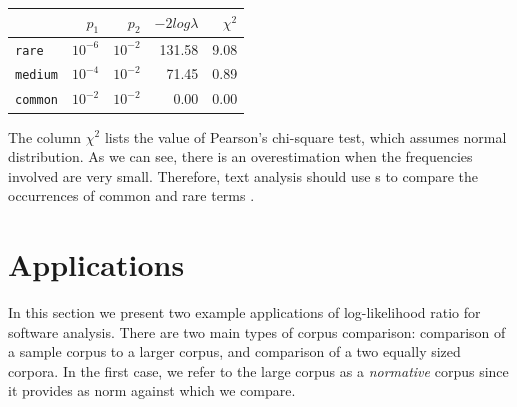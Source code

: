\begin{center}
\begin{tabular}{l | rrrr}
~ & $p_1$ & $p_2$ & $-2log\lambda$ & $\chi^2$ \\ 
\hline
\verb$rare$ & $10^{-6}$ & $10^{-2}$  & 131.58 & 9.08 \\
\verb$medium$ & $10^{-4}$ & $10^{-2}$  & 71.45 & 0.89 \\
\verb$common$ & $10^{-2}$ & $10^{-2}$  & 0.00 & 0.00 \\
\end{tabular}
\end{center}

The column $\chi^2$ lists the value of Pearson's chi-square test, which assumes normal distribution. As we can see, there is an overestimation when the frequencies involved are very small. Therefore, text analysis should use \loglr{}s to compare the occurrences of common and rare terms \cite{Dunning}.


\section{Applications}\label{applications}

In this section we present two example applications of log-likelihood ratio for software analysis.
There are two main types of corpus comparison: comparison of a sample corpus to a larger corpus, and comparison of a two equally sized corpora. In the first case, we refer to the large corpus as a \emph{normative} corpus since it provides as norm against which we compare.

